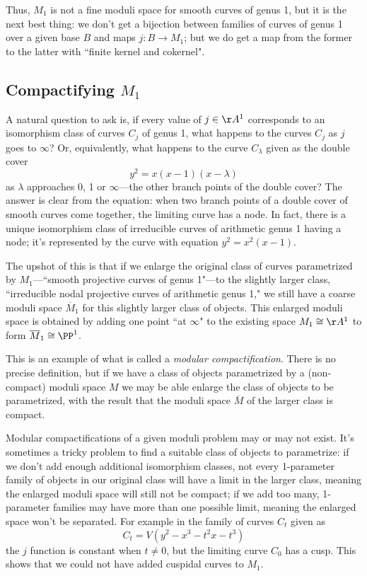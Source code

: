 Thus, $M_1$ is not a fine moduli space for smooth curves of genus 1, but it is the next best thing: we don't get a bijection between families of curves of genus 1 over a given base $B$ and maps $j : B \to M_1$; but we do get a map from the former to the latter with ``finite kernel and cokernel".

\subsection{Compactifying $M_1$}

A natural question to ask is, if every value of $j \in \AA^1$ corresponds to an isomorphism class of curves $C_j$ of genus 1, what happens to the curves $C_j$ as $j$ goes to $\infty$? Or, equivalently, what happens to the curve $C_\lambda$ given as the double cover
$$
y^2 = x(x-1)(x - \lambda)
$$
as $\lambda$ approaches 0, 1 or $\infty$---the other branch points of the double cover? The answer is clear from the equation: when two branch points of a double cover of smooth curves come together, the limiting curve has a node. In fact, there is a unique isomorphism class of irreducible curves of arithmetic genus 1 having a node; it's represented by the curve with equation $y^2=x^2(x-1)$.


The upshot of this is that if we enlarge the original class of curves parametrized by $M_1$---``smooth projective curves of genus 1"---to the slightly larger class, ``irreducible nodal projective curves of arithmetic genus 1," we still have a coarse moduli space $\overline M_1$ for this slightly larger class of objects. This enlarged moduli space is obtained by adding one point ``at $\infty$" to the existing space $M_1 \cong \AA^1$ to form $\overline M_1 \cong \PP^1$.

This is an example of what is called a \emph{modular compactification}. There is no precise definition, but if we have a class of objects parametrized by a (non-compact) moduli space $M$ we may be able enlarge the class of objects to be parametrized, with the result that the moduli space $\overline M$ of the larger class is compact. 

Modular compactifications of a given moduli problem may or may not exist. It's sometimes a tricky problem to find a suitable class of objects to parametrize: if we don't add enough additional isomorphism classes, not every 1-parameter family of objects in our original class will have a limit in the larger class, meaning the enlarged moduli space will still not be compact; if we add too many,  1-parameter families may have more than one possible limit, meaning the enlarged space won't be separated. For example in the family
 of curves $C_t$ given as
$$
C_t = V(y^2 -x^3 - t^2x - t^3)
$$
the $j$ function is constant when $t\neq 0$, but  the limiting curve $C_0$ has a cusp. This shows that
we could not have added cuspidal curves to $M_1$.


